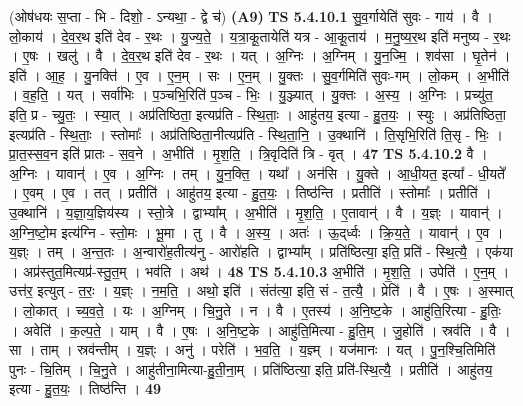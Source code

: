 \documentclass[17pt]{extarticle}
\begin{document}
                  \newline
                      (ओष॑धयः स॒प्ता - भि - दिशो॒ - ऽन्यथा॒ - द्वे च॑)  \textbf{(A9)} \newline \newline
                                \textbf{ TS 5.4.10.1} \newline
                  सु॒व॒र्गायेति॑ सुवः - गाय॑ । वै । लो॒काय॑ । दे॒व॒र॒थ इति॑ देव - र॒थः । यु॒ज्य॒ते॒ । य॒त्रा॒कू॒तायेति॑ यत्र - आ॒कू॒ताय॑ । म॒नु॒ष्य॒र॒थ इति॑ मनुष्य - र॒थः । ए॒षः । खलु॑ । वै । दे॒व॒र॒थ इति॑ देव - र॒थः । यत् । अ॒ग्निः । अ॒ग्निम् । यु॒न॒ज्मि॒ । शव॑सा । घृ॒तेन॑ । इति॑ । आ॒ह॒ । यु॒नक्ति॑ । ए॒व । ए॒न॒म् । सः । ए॒न॒म् । यु॒क्तः । सु॒व॒र्गमिति॑ सुवः-गम् । लो॒कम् । अ॒भीति॑ । व॒ह॒ति॒ । यत् । सर्वा॑भिः । प॒ञ्चभि॒रिति॑ प॒ञ्च - भिः॒ । यु॒ञ्ज्यात् । यु॒क्तः । अ॒स्य॒ । अ॒ग्निः । प्रच्यु॑त॒ इति॒ प्र - च्यु॒तः॒ । स्या॒त् । अप्र॑तिष्ठिता॒ इत्यप्र॑ति - स्थि॒ताः॒ । आहु॑तय॒ इत्या - हु॒त॒यः॒ । स्युः । अप्र॑तिष्ठिता॒ इत्यप्र॑ति - स्थि॒ताः॒ । स्तोमाः᳚ । अप्र॑तिष्ठिता॒नीत्यप्र॑ति - स्थि॒ता॒नि॒ । उ॒क्थानि॑ । ति॒सृभि॒रिति॑ ति॒सृ - भिः॒ । प्रा॒त॒स्स॒व॒न इति॑ प्रातः - स॒व॒ने । अ॒भीति॑ । मृ॒श॒ति॒ । त्रि॒वृदिति॑ त्रि - वृत् । \textbf{  47} \newline
                  \newline
                                \textbf{ TS 5.4.10.2} \newline
                  वै । अ॒ग्निः । यावान्॑ । ए॒व । अ॒ग्निः । तम् । यु॒न॒क्ति॒ । यथा᳚ । अन॑सि । यु॒क्ते । आ॒धी॒यत॒ इत्या᳚ - धी॒यते᳚ । ए॒वम् । ए॒व । तत् । प्रतीति॑ । आहु॑तय॒ इत्या - हु॒त॒यः॒ । तिष्ठ॑न्ति । प्रतीति॑ । स्तोमाः᳚ । प्रतीति॑ । उ॒क्थानि॑ । य॒ज्ञा॒य॒ज्ञिय॑स्य । स्तो॒त्रे । द्वाभ्या᳚म् । अ॒भीति॑ । मृ॒श॒ति॒ । ए॒तावान्॑ । वै । य॒ज्ञ्ः । यावान्॑ । अ॒ग्नि॒ष्टो॒म इत्य॑ग्नि - स्तो॒मः । भू॒मा । तु । वै । अ॒स्य॒ । अतः॑ । ऊ॒द्‌र्ध्वः । क्रि॒य॒ते॒ । यावान्॑ । ए॒व । य॒ज्ञ्ः । तम् । अ॒न्त॒तः । अ॒न्वारो॑ह॒तीत्य॑नु - आरो॑हति । द्वाभ्या᳚म् । प्रति॑ष्ठित्या॒ इति॒ प्रति॑ - स्थि॒त्यै॒ । एक॑या । अप्र॑स्तुत॒मित्यप्र॑-स्तु॒त॒म् । भव॑ति । अथ॑ । \textbf{  48} \newline
                  \newline
                                \textbf{ TS 5.4.10.3} \newline
                  अ॒भीति॑ । मृ॒श॒ति॒ । उपेति॑ । ए॒न॒म् । उत्त॑र॒ इत्युत् - त॒रः॒ । य॒ज्ञ्ः । न॒म॒ति॒ । अथो॒ इति॑ । संत॑त्या॒ इति॒ सं - त॒त्यै॒ । प्रेति॑ । वै । ए॒षः । अ॒स्मात् । लो॒कात् । च्य॒व॒ते॒ । यः । अ॒ग्निम् । चि॒नु॒ते । न । वै । ए॒तस्य॑ । अ॒नि॒ष्ट॒के । आहु॑ति॒रित्या - हु॒तिः॒ । अवेति॑ । क॒ल्प॒ते॒ । याम् । वै । ए॒षः । अ॒नि॒ष्ट॒के । आहु॑ति॒मित्या - हु॒ति॒म् । जु॒होति॑ । स्रव॑ति । वै । सा । ताम् । स्रव॑न्तीम् । य॒ज्ञ्ः । अनु॑ । परेति॑ । भ॒व॒ति॒ । य॒ज्ञ्म् । यज॑मानः । यत् । पु॒न॒श्चि॒तिमिति॑ पुनः - चि॒तिम् । चि॒नु॒ते । आहु॑तीना॒मित्या-हु॒ती॒ना॒म् । प्रति॑ष्ठित्या॒ इति॒ प्रति॑-स्थि॒त्यै॒ । प्रतीति॑ । आहु॑तय॒ इत्या - हु॒त॒यः॒ । तिष्ठ॑न्ति । \textbf{  49} \newline
\end{document}
